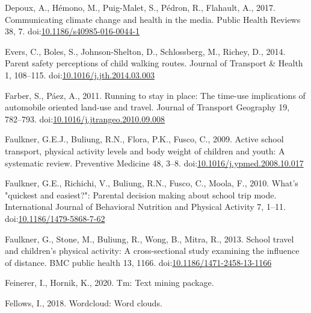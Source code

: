 \documentclass[]{elsarticle} %
\newlength{\cslhangindent}
\newlength{\cslentryspacingunit} %
\newenvironment{CSLReferences}[2] %
 {%
  \setlength{\parindent}{0pt}
  \ifodd #1
  \let\oldpar\par
  \def\par{\hangindent=\cslhangindent\oldpar}
  \fi
  \setlength{\parskip}{#2\cslentryspacingunit}
 }%
 {}
\begin{document}
\begin{CSLReferences}{1}{0}
\leavevmode{}%
Depoux, A., Hémono, M., Puig-Malet, S., Pédron, R., Flahault, A., 2017.
Communicating climate change and health in the media. Public Health
Reviews 38, 7.
doi:\href{https://doi.org/10.1186/s40985-016-0044-1}{10.1186/s40985-016-0044-1}

\leavevmode{}%
Evers, C., Boles, S., Johnson-Shelton, D., Schlossberg, M., Richey, D.,
2014. Parent safety perceptions of child walking routes. Journal of
Transport \& Health 1, 108--115.
doi:\href{https://doi.org/10.1016/j.jth.2014.03.003}{10.1016/j.jth.2014.03.003}

\leavevmode{}%
Farber, S., Páez, A., 2011. Running to stay in place: The time-use
implications of automobile oriented land-use and travel. Journal of
Transport Geography 19, 782--793.
doi:\href{https://doi.org/10.1016/j.jtrangeo.2010.09.008}{10.1016/j.jtrangeo.2010.09.008}

\leavevmode{}%
Faulkner, G.E.J., Buliung, R.N., Flora, P.K., Fusco, C., 2009. Active
school transport, physical activity levels and body weight of children
and youth: A systematic review. Preventive Medicine 48, 3--8.
doi:\href{https://doi.org/10.1016/j.ypmed.2008.10.017}{10.1016/j.ypmed.2008.10.017}

\leavevmode{}%
Faulkner, G.E., Richichi, V., Buliung, R.N., Fusco, C., Moola, F., 2010.
What's "quickest and easiest?": Parental decision making about school
trip mode. International Journal of Behavioral Nutrition and Physical
Activity 7, 1--11.
doi:\href{https://doi.org/10.1186/1479-5868-7-62}{10.1186/1479-5868-7-62}

\leavevmode{}%
Faulkner, G., Stone, M., Buliung, R., Wong, B., Mitra, R., 2013. School
travel and children's physical activity: A cross-sectional study
examining the influence of distance. BMC public health 13, 1166.
doi:\href{https://doi.org/10.1186/1471-2458-13-1166}{10.1186/1471-2458-13-1166}

\leavevmode{}%
Feinerer, I., Hornik, K., 2020. Tm: Text mining package.

\leavevmode{}%
Fellows, I., 2018. Wordcloud: Word clouds.


\end{CSLReferences}
\end{document}
